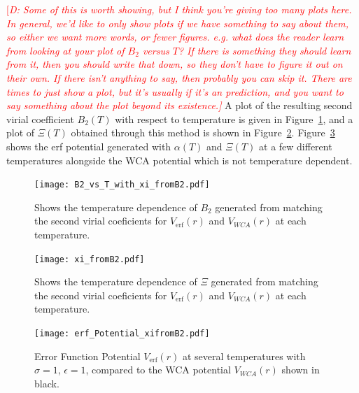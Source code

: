 \documentclass[double,12pt]{beavtex}
\newcommand\davidsays[1]{\textcolor{red}{[\it D: #1]}}
\begin{document}
\davidsays{Some of this is worth showing, but I think you're giving too many
plots here.
In general, we'd like to only show plots if we have something to say about them,
so either we want more words, or fewer figures.  e.g. what does the reader learn
from looking at your plot of $B_2$ versus $T$? If there is something they should
learn from it, then you should write that down, so they don't have to figure it
out on their own.  If there isn't anything to say, then probably you can skip
it. There \emph{are} times to just show a plot, but it's usually if it's an
prediction, and you want to say \emph{something} about the plot beyond its
existence.}
A plot of the resulting second virial coefficient $B_2(T)$  with respect 
to temperature is given in Figure~\ref{fig:B2vsT}, and a plot of $\Xi(T)$ obtained 
through this method is shown in Figure~\ref{fig:xi_fromB2vsT}. 
Figure~\ref{fig:erf_Potential_xifromB2} shows the erf potential generated with
$\alpha(T)$ and $\Xi(T)$ at a few different temperatures alongside the WCA 
potential which is not temperature dependent.

\begin{figure}[h!]
    \centering
    \texttt{[image: B2\_vs\_T\_with\_xi\_fromB2.pdf]}
    \caption{Shows the temperature dependence of $B_2$ generated from 
    matching the second virial coeficients for $V_{\operatorname{erf}}(r)$ and $V_{WCA}(r)$ 
    at each temperature.}
    \label{fig:B2vsT}
  \end{figure}

\begin{figure}[h!]
    \centering
    \texttt{[image: xi\_fromB2.pdf]}
    \caption{Shows the temperature dependence of $\Xi$ generated from 
    matching the second virial coeficients for $V_{\operatorname{erf}}(r)$ and $V_{WCA}(r)$ 
    at each temperature.}
    \label{fig:xi_fromB2vsT}
  \end{figure}

\begin{figure}[h!]
    \centering
    \texttt{[image: erf\_Potential\_xifromB2.pdf]}
    \caption{Error Function Potential $V_{\operatorname{erf}}(r)$ at several temperatures 
    with $\sigma=1$, $\epsilon=1$, compared to the WCA potential $V_{WCA}(r)$ 
    shown in black.}
    \label{fig:erf_Potential_xifromB2}
  \end{figure}


\end{document}
